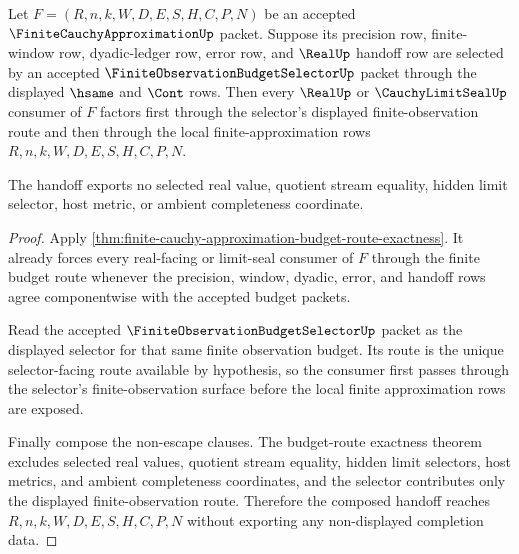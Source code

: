 \begin{theorem}
\label{thm:finite-cauchy-approximation-finite-observation-selector-handoff}
Let $F=(R,n,k,W,D,E,S,H,C,P,N)$ be an accepted $\FiniteCauchyApproximationUp$ packet. Suppose its precision row, finite-window row, dyadic-ledger row, error row, and $\RealUp$ handoff row are selected by an accepted $\FiniteObservationBudgetSelectorUp$ packet through the displayed $\hsame$ and $\Cont$ rows. Then every $\RealUp$ or $\CauchyLimitSealUp$ consumer of $F$ factors first through the selector's displayed finite-observation route and then through the local finite-approximation rows $R,n,k,W,D,E,S,H,C,P,N$.

The handoff exports no selected real value, quotient stream equality, hidden limit selector, host metric, or ambient completeness coordinate.
\end{theorem}
\begin{proof}
Apply \autoref{thm:finite-cauchy-approximation-budget-route-exactness}. It already forces every real-facing or limit-seal consumer of $F$ through the finite budget route whenever the precision, window, dyadic, error, and handoff rows agree componentwise with the accepted budget packets.

Read the accepted $\FiniteObservationBudgetSelectorUp$ packet as the displayed selector for that same finite observation budget. Its route is the unique selector-facing route available by hypothesis, so the consumer first passes through the selector's finite-observation surface before the local finite approximation rows are exposed.

Finally compose the non-escape clauses. The budget-route exactness theorem excludes selected real values, quotient stream equality, hidden limit selectors, host metrics, and ambient completeness coordinates, and the selector contributes only the displayed finite-observation route. Therefore the composed handoff reaches $R,n,k,W,D,E,S,H,C,P,N$ without exporting any non-displayed completion data.
\end{proof}

